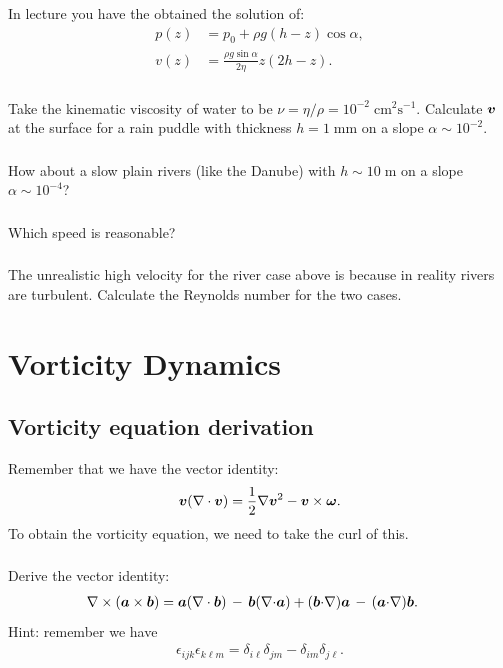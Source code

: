 \documentclass[11pt,letterpaper]{report}
\begin{document}
In lecture you have the obtained the solution of:
\begin{align}
    p(z) &= p_0+\rho g(h-z)\cos\alpha,\\
    v(z) &= \frac{\rho g\sin\alpha}{2\eta}z(2h-z).
\end{align}

\subsection{}
Take the kinematic viscosity of water to be $\nu = \eta/\rho = 10^{-2}\;\text{cm}^2\text{s}^{-1}$. Calculate $\boldsymbol{v}$ at the surface for a rain puddle with thickness $h = 1\;\text{mm}$ on a slope $\alpha\sim 10^{-2}$.

\subsection{}
How about a slow plain rivers (like the Danube) with $h \sim 10\;\text{m}$ on a slope $\alpha\sim 10^{-4}$?

\subsection{}
Which speed is reasonable?

\subsection{}
The unrealistic high velocity for the river case above is because in reality rivers are turbulent. Calculate the Reynolds number for the two cases.

\chapter{Vorticity Dynamics}
\section{Vorticity equation derivation}
Remember that we have the vector identity:
\begin{align}
    \boldsymbol{v}(\nabla\cdot\boldsymbol{v}) = \frac{1}{2}\nabla\boldsymbol{v}^2-\boldsymbol{v}\times\boldsymbol{\omega}.\label{eq:lamb_ident}
\end{align}
To obtain the vorticity equation, we need to take the curl of this. 

\subsection{}
Derive the vector identity:
\begin{align}
    \nabla\times(\boldsymbol{a}\times\boldsymbol{b}) &= \boldsymbol{a}(\nabla \cdot \boldsymbol{b}) \,-\, \boldsymbol{b}(\nabla {\cdot} \boldsymbol{a})+(\boldsymbol{b} {\cdot} \nabla) \boldsymbol{a} \,-\, (\boldsymbol{a} {\cdot} \nabla) \boldsymbol{b}.
\end{align}
Hint: remember we have
\begin{align}
    \epsilon_{ijk}\epsilon_{k\ell m} = \delta_{i\ell}\delta_{jm}-\delta_{im}\delta_{j\ell}.\label{eq:perm_prod_ident}
\end{align}
\end{document}
